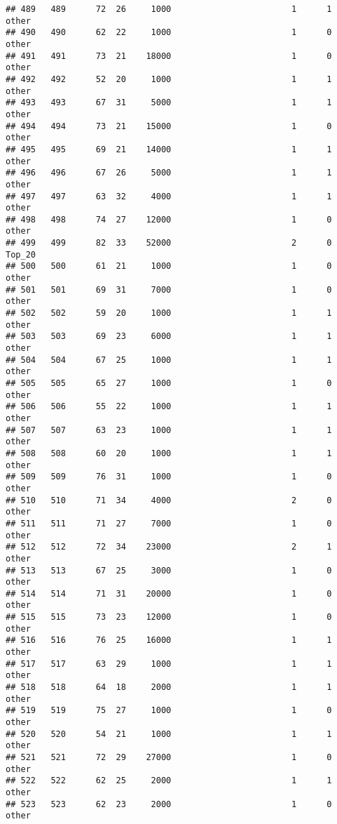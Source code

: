 \documentclass[
]{article}
\begin{document}
\begin{verbatim}
## 489   489      72  26     1000                        1      1    other
## 490   490      62  22     1000                        1      0    other
## 491   491      73  21    18000                        1      0    other
## 492   492      52  20     1000                        1      1    other
## 493   493      67  31     5000                        1      1    other
## 494   494      73  21    15000                        1      0    other
## 495   495      69  21    14000                        1      1    other
## 496   496      67  26     5000                        1      1    other
## 497   497      63  32     4000                        1      1    other
## 498   498      74  27    12000                        1      0    other
## 499   499      82  33    52000                        2      0   Top_20
## 500   500      61  21     1000                        1      0    other
## 501   501      69  31     7000                        1      0    other
## 502   502      59  20     1000                        1      1    other
## 503   503      69  23     6000                        1      1    other
## 504   504      67  25     1000                        1      1    other
## 505   505      65  27     1000                        1      0    other
## 506   506      55  22     1000                        1      1    other
## 507   507      63  23     1000                        1      1    other
## 508   508      60  20     1000                        1      1    other
## 509   509      76  31     1000                        1      0    other
## 510   510      71  34     4000                        2      0    other
## 511   511      71  27     7000                        1      0    other
## 512   512      72  34    23000                        2      1    other
## 513   513      67  25     3000                        1      0    other
## 514   514      71  31    20000                        1      0    other
## 515   515      73  23    12000                        1      0    other
## 516   516      76  25    16000                        1      1    other
## 517   517      63  29     1000                        1      1    other
## 518   518      64  18     2000                        1      1    other
## 519   519      75  27     1000                        1      0    other
## 520   520      54  21     1000                        1      1    other
## 521   521      72  29    27000                        1      0    other
## 522   522      62  25     2000                        1      1    other
## 523   523      62  23     2000                        1      0    other

\end{verbatim}
\end{document}
